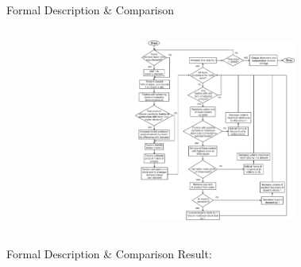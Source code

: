 \documentclass[12pt, notes=show,handout=no]{beamer}
\begin{document}
\begin{frame}{Formal Description \& Comparison}
{\begin{center}
\begin{columns}
\begin{column}{.4\textwidth}
		    \end{column}
		    \begin{column}{.4\textwidth}

		\includegraphics[height=6cm]{images/formalModel.png}
		    \end{column}
		\end{columns}
	    \end{center}
    }

\end{frame}
\begin{frame}{Formal Description \& Comparison}
	Result:\\
	\begin{center}

	\end{center}

\end{frame}
\end{document}
